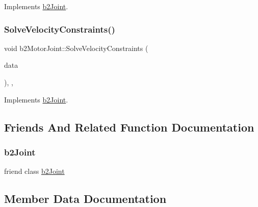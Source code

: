 Implements \mbox{\hyperlink{classb2_joint_af767ac9aa494bd15cdf83dfe3e487d9c}{b2\+Joint}}.

\mbox{\label{classb2_motor_joint_a620c75b301aeab409f9d50a041a80fb8}} 
\subsubsection{\texorpdfstring{SolveVelocityConstraints()}{SolveVelocityConstraints()}}
{\footnotesize\ttfamily void b2\+Motor\+Joint\+::\+Solve\+Velocity\+Constraints (\begin{DoxyParamCaption}\item[{const \mbox{\hyperlink{structb2_solver_data}{b2\+Solver\+Data}} \&}]{data }\end{DoxyParamCaption})\hspace{0.3cm}{\ttfamily [override]}, {\ttfamily [protected]}, {\ttfamily [virtual]}}



Implements \mbox{\hyperlink{classb2_joint_ad302c8d02efcfe934158de0dc429348d}{b2\+Joint}}.



\subsection{Friends And Related Function Documentation}
\mbox{\label{classb2_motor_joint_a54ade8ed3d794298108d7f4c4e4793fa}} 
\subsubsection{\texorpdfstring{b2Joint}{b2Joint}}
{\footnotesize\ttfamily friend class \mbox{\hyperlink{classb2_joint}{b2\+Joint}}\hspace{0.3cm}{\ttfamily [friend]}}



\subsection{Member Data Documentation}
\mbox{\label{classb2_motor_joint_a76fd4aa158014c7fd653ca47c0e3c50a}} 
